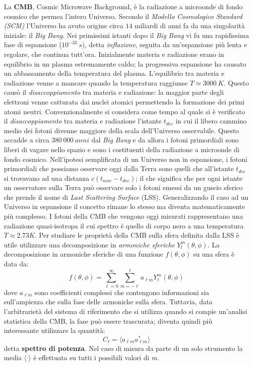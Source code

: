 \documentclass[12pt,a4paper,final]{book}
\begin{document}
La \textbf{CMB}, Cosmic Microwave Background, è la radiazione a microonde di fondo cosmico che permea l’intero Universo.
Secondo il \textit{Modello Cosmologico Standard (SCM)} l'Universo ha avuto origine circa $14$ miliardi di anni fa da una singolarità iniziale: il \textit{Big Bang}.
Nei primissimi istanti dopo il \textit{Big Bang} vi fu una rapidissima fase di espansione ($10^{-33}~\unit{s}$), detta \textit{inflazione}, seguita da un'espansione più lenta e regolare, che continua tutt'ora. Inizialmente materia e radiazione erano in equilibrio in un plasma estremamente caldo; la progressiva espansione ha causato un abbassamento della temperatura del plasma. L'equilibrio tra materia e radiazione venne a mancare quando la temperatura raggiunse $T \simeq 3000~\unit{K}$. Questo causò il \textit{disaccoppiamento} tra materia e radiazione: la maggior parte degli elettroni venne catturata dai nuclei atomici permettendo la formazione dei primi atomi neutri. Convenzionalmente si considera come tempo al quale si è verificato il \textit{disaccoppiamento} tra materia e radiazione l'istante $t_{dec}$ in cui il libero cammino medio dei fotoni divenne maggiore della scala dell'Universo osservabile. Questo accadde a circa $380~000~\unit{anni}$ dal \textit{Big Bang} e da allora i fotoni primordiali sono liberi di vagare nello spazio e sono i costituenti della radiazione a microonde di fondo cosmico.
Nell'ipotesi semplificata di un Universo non in espansione, i fotoni primordiali che possiamo osservare oggi dalla Terra sono quelli che all'istante $t_{dec}$ si trovavano ad una distanza $c(t_{now}-t_{dec})$; il che significa che per ogni istante un osservatore sulla Terra può osservare solo i fotoni emessi da un guscio sferico che prende il nome di \textit{Last Scattering Surface} (LSS). Generalizzando il caso ad un Universo in espansione il concetto rimane lo stesso ma diventa matematicamente più complesso. I fotoni della CMB che vengono oggi misurati rappresentano una radiazione quasi-isotropa il cui spettro è quello di corpo nero a una temperatura $T\approx2.73\unit{K}$. Per studiare le proprietà della CMB sulla sfera definita dalla LSS è utile utilizzare una decomposizione in \textit{armoniche sferiche} $Y_l^m(\theta,\phi)$. La decomposizione in armoniche sferiche di una funzione $f(\theta,\phi)$ su una sfera è data da:
\[f(\theta,\phi)=\sum_{\ell=0}^\infty\sum_{m=-\ell}^\ell a_{\ell m}Y_\ell^m(\theta,\phi)\]
dove $a_{\ell m}$ sono coefficienti complessi che contengono informazioni sia sull'ampiezza che sulla fase delle armoniche sulla sfera. Tuttavia, data l'arbitrarietà del sistema di riferimento che si utilizza quando si compie un'analisi statistica della CMB, la fase può essere trascurata; diventa quindi più interessante utilizzare la quantità: \[C_{\ell}=\langle a_{\ell m} a_{\ell m}^* \rangle\]
detta \textbf{spettro di potenza}. Nel caso di misura da parte di un solo strumento la media $\langle \cdot \rangle$ è effettuata su tutti i possibili valori di \textit{m}.
\end{document}

